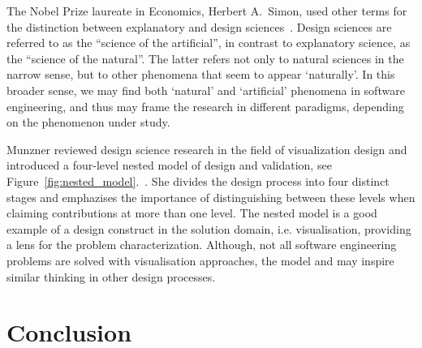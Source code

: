 \documentclass[graybox]{svmult}
\newcommand{\per}[1]{\textcolor{cyan}{{\it [Per says: #1]}}}
\newcommand{\per}[1]{}
\begin{document}

The Nobel Prize laureate in Economics, Herbert A.\ Simon, used other terms for the distinction between explanatory and design sciences~\cite{Simons69}. Design sciences are referred to as the ``science of the artificial'', in contrast to explanatory science, as the ``science of the natural''. The latter refers not only to natural sciences in the narrow sense, but to other phenomena that seem to appear `naturally'. In this broader sense, we may find both `natural' and `artificial' phenomena in software engineering, and thus may frame the research in different paradigms, depending on the phenomenon under study. 

Munzner reviewed design science research in the field of visualization design and introduced a four-level nested model of design and validation, see Figure~\ref{fig:nested_model}.~\cite{munzner2009}. She divides the design process into four distinct stages and emphazises the importance of distinguishing between these levels when claiming contributions at more than one level. The nested model is a good example of a design construct in the solution domain, i.e. visualisation, providing a lens for the problem characterization. Although, not all software engineering problems are solved with visualisation approaches, the model and may inspire similar thinking in other design processes. 







\section{Conclusion}
\label{sec:conclusion}




\end{document}
